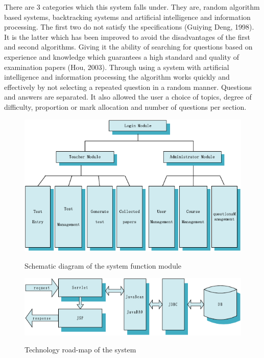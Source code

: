 There are 3 categories which this system falls under. They are, random algorithm based systems, backtracking systems and artificial intelligence and information processing. The first two do not satisfy the specifications (Guiying Deng, 1998). It is the latter which has been improved to avoid the disadvantages of the first and second algorithms. Giving it the ability of searching for questions based on experience and knowledge which guarantees a high standard and quality of examination papers (Hou, 2003). Through using a system with artificial intelligence and information processing the algorithm works quickly and effectively by not selecting a repeated question in a random manner. Questions and answers are separated. It also allowed the user a choice of topics, degree of difficulty, proportion or mark allocation and number of questions per section.

\begin{figure}[htbp]
\center \includegraphics[width=400pt]{Figures/function_module}\\
\caption{Schematic diagram of the system function module \citep{TP-16}} \label{Figure: Schematic diagram of the system function module}
\end{figure}

\begin{figure}[htbp]
\center \includegraphics[width=400pt]{Figures/road_map}\\
\caption{Technology road-map of the system \citep{TP-16}} \label{Figure: Technology road-map of the system}
\end{figure}

